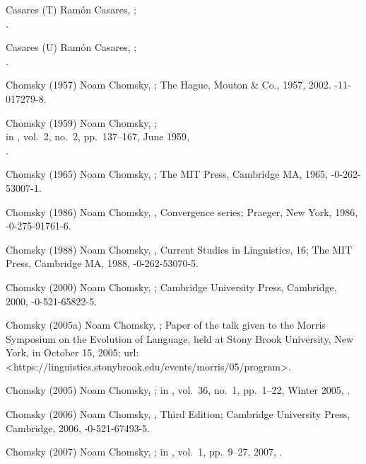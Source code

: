 \biblabel Casares (T)
Ramón Casares,
;\\
.

\biblabel Casares (U)
Ramón Casares,
;\\
.

\biblabel Chomsky (1957)
Noam Chomsky,
;
The Hague, Mouton \& Co., 1957, 2002.
-11-017279-8.

\biblabel Chomsky (1959)
Noam Chomsky,
;\\
in ,
vol.\ 2, no.\ 2, pp.\ 137--167, June 1959,\\
.

\biblabel Chomsky (1965)
Noam Chomsky,
;
The MIT Press, Cambridge MA, 1965,
-0-262-53007-1.

\biblabel Chomsky (1986)
Noam Chomsky,
,
Convergence series;
Praeger, New York, 1986,
-0-275-91761-6.

\biblabel Chomsky (1988)
Noam Chomsky,
,
Current Studies in Linguistics, 16;
The MIT Press, Cambridge MA, 1988,
-0-262-53070-5.

\biblabel Chomsky (2000)
Noam Chomsky,
;
Cambridge University Press, Cambridge, 2000,
-0-521-65822-5.

\biblabel Chomsky (2005a)
Noam Chomsky,
;
Paper of the talk given to the
Morris Symposium on the Evolution of Language,
held at Stony Brook University, New York,
in October 15, 2005;
{\sc url:}
\URL<https://linguistics.stonybrook.edu/events/morris/05/program>.

\biblabel Chomsky (2005)
Noam Chomsky,
;
in ,
vol.\ 36, no.\ 1, pp.\ 1--22, Winter 2005,
.

\biblabel Chomsky (2006)
Noam Chomsky,
, Third Edition;
Cambridge University Press, Cambridge, 2006,
-0-521-67493-5.

\biblabel Chomsky (2007)
Noam Chomsky,
;
in ,
vol.\ 1, pp.\ 9--27, 2007,
.

